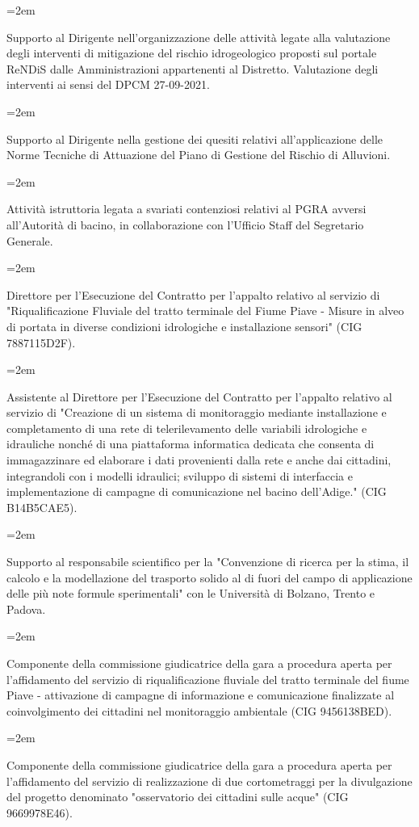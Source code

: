 \documentclass{scrartcl}
\renewcommand{\spacedallcaps}[1]{ \textls[160]{\MakeUppercase{#1}} }
\newcommand{\Description}[1]{\hangindent=2em\hangafter=0\noindent\raggedright\footnotesize{#1}\par\normalsize\vspace{1em}} %
\begin{document}
\begin{cv}{\spacedallcaps{Matteo Facchini}}
\Description{Supporto al Dirigente nell'organizzazione delle attività legate alla valutazione degli interventi di mitigazione del rischio idrogeologico proposti sul portale ReNDiS dalle Amministrazioni appartenenti al Distretto. Valutazione degli interventi ai sensi del DPCM 27-09-2021.}

\Description{Supporto al Dirigente nella gestione dei quesiti relativi all'applicazione delle Norme Tecniche di Attuazione del Piano di Gestione del Rischio di Alluvioni.}

\Description{Attività istruttoria legata a svariati contenziosi relativi al PGRA avversi all'Autorità di bacino, in collaborazione con l'Ufficio Staff del Segretario Generale.}

\Description{Direttore per l'Esecuzione del Contratto per l'appalto relativo al servizio di "Riqualificazione Fluviale del tratto terminale del Fiume Piave - Misure in alveo di portata in diverse condizioni idrologiche e installazione sensori" (CIG 7887115D2F).}

\Description{Assistente al Direttore per l'Esecuzione del Contratto per l'appalto relativo al servizio di "Creazione di un sistema di monitoraggio mediante installazione e completamento di una rete di telerilevamento delle variabili idrologiche e idrauliche nonché di una piattaforma informatica dedicata che consenta di immagazzinare ed elaborare i dati provenienti dalla rete e anche dai cittadini, integrandoli con i modelli idraulici; sviluppo di sistemi di interfaccia e implementazione di campagne di comunicazione nel bacino dell'Adige." (CIG B14B5CAE5).}

\Description{Supporto al responsabile scientifico per la "Convenzione di ricerca per la stima, il calcolo e la modellazione del trasporto solido al di fuori del campo di applicazione delle più note formule sperimentali" con le Università di Bolzano, Trento e Padova.}

\Description{Componente della commissione giudicatrice della gara a procedura aperta per l'affidamento del servizio di riqualificazione fluviale del tratto terminale del fiume Piave - attivazione di campagne di informazione e comunicazione finalizzate al coinvolgimento dei cittadini nel monitoraggio ambientale (CIG 9456138BED).}

\Description{Componente della commissione giudicatrice della gara a procedura aperta per l'affidamento del servizio di realizzazione di due cortometraggi per la divulgazione del progetto denominato "osservatorio dei cittadini sulle acque" (CIG 9669978E46).}


\end{cv}
\end{document}
